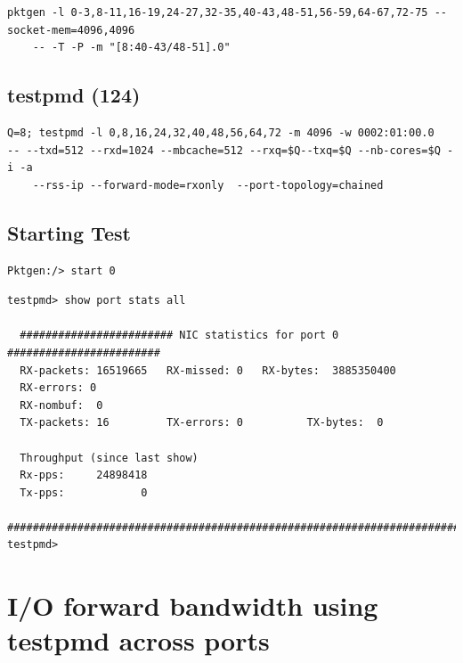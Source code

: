 \documentclass[letter]{article}
\begin{document}
{{%
\begin{lstlisting}
pktgen -l 0-3,8-11,16-19,24-27,32-35,40-43,48-51,56-59,64-67,72-75 --socket-mem=4096,4096 
	-- -T -P -m "[8:40-43/48-51].0"
\end{lstlisting}

\subsection{testpmd (124)}

\begin{lstlisting}[escapechar=!]
Q=8; testpmd -l 0,8,16,24,32,40,48,56,64,72 -m 4096 -w 0002:01:00.0 
-- --txd=512 --rxd=1024 --mbcache=512 --rxq=$Q--txq=$Q --nb-cores=$Q -i -a 
	--rss-ip --forward-mode=rxonly  --port-topology=chained
\end{lstlisting}

\subsection{Starting Test}

\begin{lstlisting}[escapechar=!]
Pktgen:/> start 0
\end{lstlisting}

\begin{lstlisting}
testpmd> show port stats all

  ######################## NIC statistics for port 0  ########################
  RX-packets: 16519665   RX-missed: 0   RX-bytes:  3885350400
  RX-errors: 0
  RX-nombuf:  0         
  TX-packets: 16         TX-errors: 0          TX-bytes:  0

  Throughput (since last show)
  Rx-pps:     24898418
  Tx-pps:            0
  ############################################################################
testpmd> 
\end{lstlisting}




\section{I/O forward bandwidth using testpmd across ports}

}}
\end{document}
